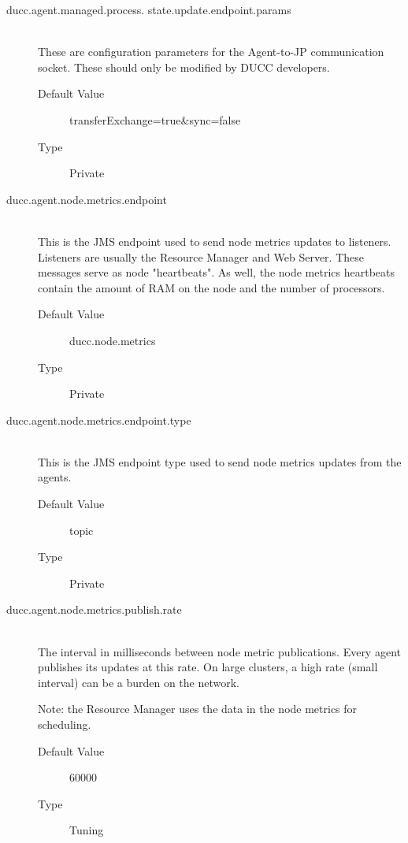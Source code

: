 \begin{description}
        \item[ducc.agent.managed.process. state.update.endpoint.params] \hfill \\
          These are configuration parameters for the Agent-to-JP communication socket. These 
          should only be modified by DUCC developers. 
          \begin{description}
            \item[Default Value] transferExchange=true\&sync=false 
            \item[Type] Private
          \end{description} 
          
        \item[ducc.agent.node.metrics.endpoint] \hfill \\
          This is the JMS endpoint used to send node metrics updates to listeners. Listeners 
          are usually the Resource Manager and Web Server. These messages serve as node 
          "heartbeats". As well, the node metrics heartbeats contain the amount of RAM on the node 
          and the number of processors. 
          \begin{description}
            \item[Default Value] ducc.node.metrics 
            \item[Type] Private 
          \end{description}
          
        \item[ducc.agent.node.metrics.endpoint.type] \hfill \\
          This is the JMS endpoint type used to send node metrics updates from the agents. 
          \begin{description}
            \item[Default Value] topic 
            \item[Type] Private 
          \end{description}
         
        \item[ducc.agent.node.metrics.publish.rate] \hfill \\
          The interval in milliseconds between node metric publications.
          Every agent publishes its updates at this rate.  On large clusters, a high rate (small 
          interval) can be a burden on the network.

          Note: the Resource Manager uses the data in the node metrics for scheduling.
          \begin{description}
            \item[Default Value] 60000 
            \item[Type] Tuning 
          \end{description}
          

\end{description}
